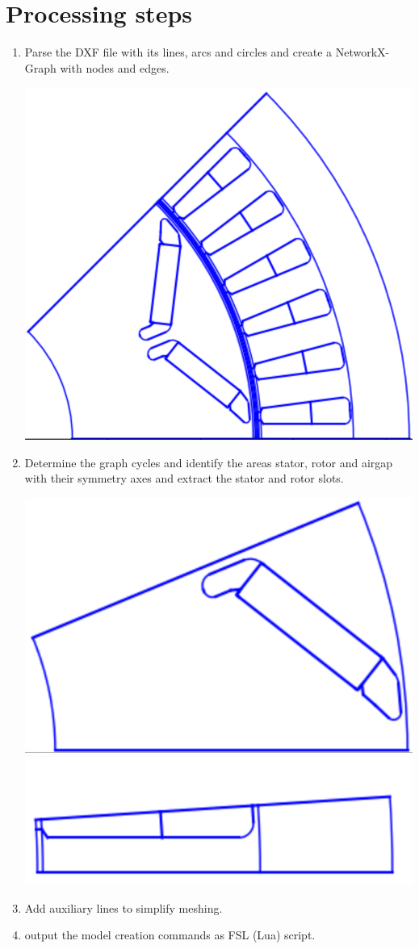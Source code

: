 \documentclass[10pt, a4paper,german]{scrartcl}
\begin{document}
\section{Processing steps}
\begin{enumerate}
\item
  Parse the DXF file with its lines, arcs and circles and create a NetworkX-Graph with nodes and edges.
\begin{center}
\includegraphics[width=0.45\linewidth]{step1}
\end{center}
\item Determine the graph cycles and identify the areas stator, rotor and airgap with their symmetry axes and extract
  the stator and rotor slots.

\includegraphics[width=0.45\linewidth]{step2}\hfill
\includegraphics[width=0.45\linewidth]{step4}
\item
  Add auxiliary lines to simplify meshing.
\item
   output the model creation commands as FSL (Lua) script.
\end{enumerate}
\end{document}
